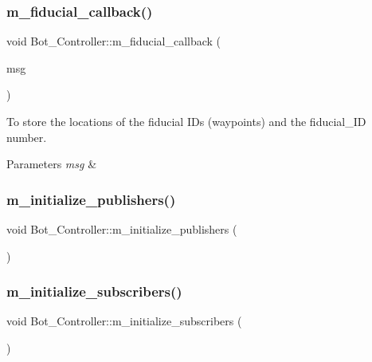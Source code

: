 \subsubsection{\texorpdfstring{m\+\_\+fiducial\+\_\+callback()}{m\_fiducial\_callback()}}
{\footnotesize\ttfamily void Bot\+\_\+\+Controller\+::m\+\_\+fiducial\+\_\+callback (\begin{DoxyParamCaption}\item[{const fiducial\+\_\+msgs\+::\+Fiducial\+Transform\+Array\+::\+Const\+Ptr \&}]{msg }\end{DoxyParamCaption})\hspace{0.3cm}{\ttfamily [protected]}}



To store the locations of the fiducial I\+Ds (waypoints) and the fiducial\+\_\+\+ID number. 


\begin{DoxyParams}{Parameters}
{\em msg} & \\
\hline
\end{DoxyParams}
\mbox{\label{class_bot___controller_ab8d1e3dd6aced881ebcc76e32aaf0910}} 
\subsubsection{\texorpdfstring{m\+\_\+initialize\+\_\+publishers()}{m\_initialize\_publishers()}}
{\footnotesize\ttfamily void Bot\+\_\+\+Controller\+::m\+\_\+initialize\+\_\+publishers (\begin{DoxyParamCaption}{ }\end{DoxyParamCaption})\hspace{0.3cm}{\ttfamily [protected]}}

\mbox{\label{class_bot___controller_a90bb076f647b36f2cf5b5e57ae98ce41}} 
\subsubsection{\texorpdfstring{m\+\_\+initialize\+\_\+subscribers()}{m\_initialize\_subscribers()}}
{\footnotesize\ttfamily void Bot\+\_\+\+Controller\+::m\+\_\+initialize\+\_\+subscribers (\begin{DoxyParamCaption}{ }\end{DoxyParamCaption})\hspace{0.3cm}{\ttfamily [protected]}}

